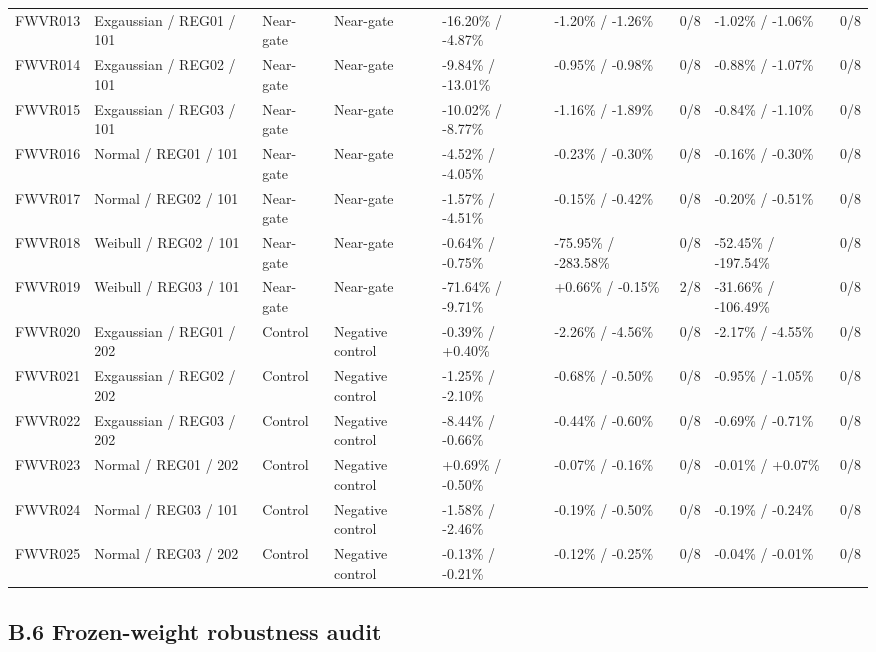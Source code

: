 \begin{table}
{\begin{tabular}{@{}lllllllll@{}}
\addlinespace[0.35em]
FWVR013 & Exgaussian / REG01 / 101 & Near-gate & Near-gate & -16.20\% / -4.87\% & -1.20\% / -1.26\% & 0/8 & -1.02\% / -1.06\% & 0/8 \\
FWVR014 & Exgaussian / REG02 / 101 & Near-gate & Near-gate & -9.84\% / -13.01\% & -0.95\% / -0.98\% & 0/8 & -0.88\% / -1.07\% & 0/8 \\
FWVR015 & Exgaussian / REG03 / 101 & Near-gate & Near-gate & -10.02\% / -8.77\% & -1.16\% / -1.89\% & 0/8 & -0.84\% / -1.10\% & 0/8 \\
FWVR016 & Normal / REG01 / 101 & Near-gate & Near-gate & -4.52\% / -4.05\% & -0.23\% / -0.30\% & 0/8 & -0.16\% / -0.30\% & 0/8 \\
FWVR017 & Normal / REG02 / 101 & Near-gate & Near-gate & -1.57\% / -4.51\% & -0.15\% / -0.42\% & 0/8 & -0.20\% / -0.51\% & 0/8 \\
FWVR018 & Weibull / REG02 / 101 & Near-gate & Near-gate & -0.64\% / -0.75\% & -75.95\% / -283.58\% & 0/8 & -52.45\% / -197.54\% & 0/8 \\
FWVR019 & Weibull / REG03 / 101 & Near-gate & Near-gate & -71.64\% / -9.71\% & +0.66\% / -0.15\% & 2/8 & -31.66\% / -106.49\% & 0/8 \\
\addlinespace[0.35em]
FWVR020 & Exgaussian / REG01 / 202 & Control & Negative control & -0.39\% / +0.40\% & -2.26\% / -4.56\% & 0/8 & -2.17\% / -4.55\% & 0/8 \\
FWVR021 & Exgaussian / REG02 / 202 & Control & Negative control & -1.25\% / -2.10\% & -0.68\% / -0.50\% & 0/8 & -0.95\% / -1.05\% & 0/8 \\
FWVR022 & Exgaussian / REG03 / 202 & Control & Negative control & -8.44\% / -0.66\% & -0.44\% / -0.60\% & 0/8 & -0.69\% / -0.71\% & 0/8 \\
FWVR023 & Normal / REG01 / 202 & Control & Negative control & +0.69\% / -0.50\% & -0.07\% / -0.16\% & 0/8 & -0.01\% / +0.07\% & 0/8 \\
FWVR024 & Normal / REG03 / 101 & Control & Negative control & -1.58\% / -2.46\% & -0.19\% / -0.50\% & 0/8 & -0.19\% / -0.24\% & 0/8 \\
FWVR025 & Normal / REG03 / 202 & Control & Negative control & -0.13\% / -0.21\% & -0.12\% / -0.25\% & 0/8 & -0.04\% / -0.01\% & 0/8 \\
\bottomrule
\end{tabular}%
}
\end{table}
\FloatBarrier

\subsection*{B.6 Frozen-weight robustness audit}

